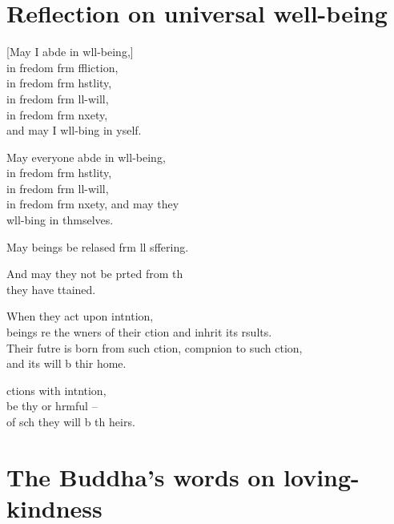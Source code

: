 \chapter[Universal well-being]{Reflection on universal well-being}

\begin{leader}
\end{leader}

[May I abde in wll-being,]\\
in fredom frm ffliction,\\
in fredom frm hstlity,\\
in fredom frm ll-will,\\
in fredom frm nxety,\\
and may I  wll-bing in yself.

May everyone abde in wll-being,\\
in fredom frm hstlity,\\
in fredom frm ll-will,\\
in fredom frm nxety, and may they\\
 wll-bing in thmselves.

May  beings be relased frm ll sffering.

And may they not be prted from th\\
 they have ttained.

When they act upon intntion,\\
 beings re the wners of their ction and inhrit its rsults.\\
Their futre is born from such ction, compnion to such ction,\\
and its  will b thir home.

 ctions with intntion,\\
be thy  or hrmful --\\
of sch  they will b th heirs.
\chapter[Loving-kindness]{The Buddha's words on loving-kindness}

